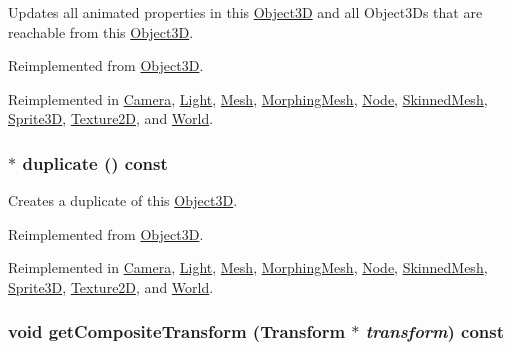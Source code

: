 Updates all animated properties in this \hyperlink{classm3g_1_1Object3D}{Object3D} and all Object3Ds that are reachable from this \hyperlink{classm3g_1_1Object3D}{Object3D}. 

Reimplemented from \hyperlink{classm3g_1_1Object3D_8aad1ceab4c2a03609c8a42324ce484d}{Object3D}.

Reimplemented in \hyperlink{classm3g_1_1Camera_8aad1ceab4c2a03609c8a42324ce484d}{Camera}, \hyperlink{classm3g_1_1Light_8aad1ceab4c2a03609c8a42324ce484d}{Light}, \hyperlink{classm3g_1_1Mesh_8aad1ceab4c2a03609c8a42324ce484d}{Mesh}, \hyperlink{classm3g_1_1MorphingMesh_8aad1ceab4c2a03609c8a42324ce484d}{MorphingMesh}, \hyperlink{classm3g_1_1Node_8aad1ceab4c2a03609c8a42324ce484d}{Node}, \hyperlink{classm3g_1_1SkinnedMesh_8aad1ceab4c2a03609c8a42324ce484d}{SkinnedMesh}, \hyperlink{classm3g_1_1Sprite3D_8aad1ceab4c2a03609c8a42324ce484d}{Sprite3D}, \hyperlink{classm3g_1_1Texture2D_8aad1ceab4c2a03609c8a42324ce484d}{Texture2D}, and \hyperlink{classm3g_1_1World_8aad1ceab4c2a03609c8a42324ce484d}{World}.\hypertarget{classm3g_1_1Transformable_4f64f95a34c56cb1553dc6de660dff6f}{
\subsubsection[{duplicate}]{ $\ast$ duplicate () const}}
\label{classm3g_1_1Transformable_4f64f95a34c56cb1553dc6de660dff6f}


Creates a duplicate of this \hyperlink{classm3g_1_1Object3D}{Object3D}. 

Reimplemented from \hyperlink{classm3g_1_1Object3D_a25110dac934f867b83b73ad4741a0f4}{Object3D}.

Reimplemented in \hyperlink{classm3g_1_1Camera_6279f7f8ab52af683fadd193d7694f2d}{Camera}, \hyperlink{classm3g_1_1Light_7a41af040d0c1566358d84f089cd0cd1}{Light}, \hyperlink{classm3g_1_1Mesh_52ce6d0b3eda2bd3a95bfb5b7dbb6f82}{Mesh}, \hyperlink{classm3g_1_1MorphingMesh_7e7b2c3c4c988c6341a5e249bd468f57}{MorphingMesh}, \hyperlink{classm3g_1_1Node_0b9f7531a4b56d34f47aeb1fff0d37e0}{Node}, \hyperlink{classm3g_1_1SkinnedMesh_d3f422cf7656b73687d789094c7eae42}{SkinnedMesh}, \hyperlink{classm3g_1_1Sprite3D_0af34e87be803eb476f9e118d2363246}{Sprite3D}, \hyperlink{classm3g_1_1Texture2D_f4b50abcea8e4a6d6981c779d5009c05}{Texture2D}, and \hyperlink{classm3g_1_1World_efde97aaf753d48fff769d9011f187f2}{World}.\hypertarget{classm3g_1_1Transformable_263ef66efed11b7f9678e2e4bbec4c55}{
\subsubsection[{getCompositeTransform}]{\setlength{\rightskip}{0pt plus 5cm}void getCompositeTransform ({\bf Transform} $\ast$ {\em transform}) const}}
\label{classm3g_1_1Transformable_263ef66efed11b7f9678e2e4bbec4c55}



